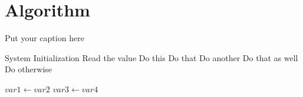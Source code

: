 \section{Algorithm}
\label{sec:alg}

\begin{algorithm}[H]
\caption{Put your caption here}
\begin{algorithmic}[1]

       
    \State System Initialization
    \State Read the value 
        \State Do this
        \State Do that
        \State Do another
        \State Do that as well
        \Else
        \State Do otherwise
        \EndIf
    \EndIf

      
        \State $var1 \leftarrow var2$  
        \State $var3 \leftarrow var4$
    \EndWhile  \label{roy's loop}
\EndProcedure
\end{algorithmic}
\end{algorithm}


